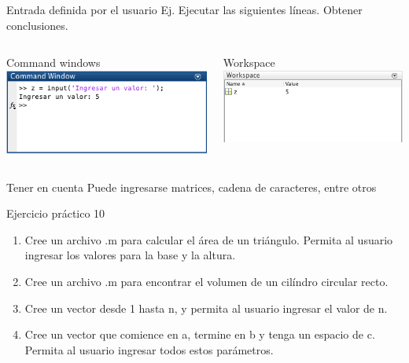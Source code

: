 \documentclass{bredelebeamer}
\begin{document}
\begin{frame}{Entrada definida por el usuario}
Ej. Ejecutar las siguientes líneas. Obtener conclusiones.

\begin{columns}
\begin{column}{0.5\textwidth}
\begin{center}
Command windows
\includegraphics[scale=0.3]{images/pantalla1.png}
\end{center}
\end{column}
\begin{column}{0.3\textwidth}
\begin{center}
Workspace
\includegraphics[scale=0.3]{images/pantalla2.png}
\end{center}
\end{column}
\end{columns}
\begin{block}{Tener en cuenta}
Puede ingresarse matrices, cadena de caracteres, entre otros
\end{block}
\end{frame}

\begin{frame}{Ejercicio práctico 10}
\begin{enumerate}
\item Cree un archivo .m para calcular el área de un triángulo. Permita al usuario ingresar los valores para la base y la altura.
\item Cree un archivo .m para encontrar el volumen de un cilíndro circular recto.
\item Cree un vector desde 1 hasta n, y permita al usuario ingresar el valor de n.
\item Cree un vector que comience en a, termine en b y tenga un espacio de c. Permita al usuario ingresar todos estos parámetros.
\end{enumerate}
\end{frame}
\end{document}
